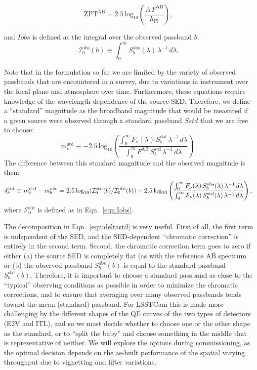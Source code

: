 \documentclass[SE,authoryear,lsstdraft,toc]{lsstdoc}
\newcommand{\mobs}{m_b^{\mathrm{obs}}}
\newcommand{\mstd}{m_b^{\mathrm{std}}}
\newcommand{\Sobs}{S_b^{\mathrm{obs}}}
\newcommand{\Sstd}{S_b^{\mathrm{std}}}
\newcommand{\Iobs}{\mathcal{I}_0^{\mathrm{obs}}}
\newcommand{\Istd}{\mathcal{I}_0^{\mathrm{std}}}
\begin{document}
\begin{equation}
\mathrm{ZPT}^{\mathrm{AB}} = 2.5\,\mathrm{log}_{10}
 \left (\frac{A\,F^{\mathrm{AB}}}{h_{\mathrm{Pl}}} \right ),
\end{equation}

and $Iobs$ is defined as the integral over the observed passband $b$:
%
\begin{equation}
\label{eqn:Iobs}
\Iobs(b) \equiv \int_0^\infty \Sobs(\lambda)\,\lambda^{-1}\,d\lambda.
\end{equation}
%

Note that in the formulation so far we are limited by the variety of observed
passbands that are encountered in a survey, due to variations in instrument
over the focal plane and atmosphere over time.  Furthermore, these equations
require knowledge of the wavelength dependence of the source SED.  Therefore,
we define a ``standard'' magnitude as the broadband magnitude that would be
measured if a given source were observed through a standard passband $Sstd$
that we are free to choose:
%
\begin{equation}
\mstd \equiv -2.5\,\mathrm{log}_{10} \left ( \frac{\int_0^\infty
  F_\nu(\lambda)\,\Sstd\,\lambda^{-1}\,d\lambda}{\int_0^\infty
  F^{\mathrm{AB}}\,\Sstd\,\lambda^{-1}\,d\lambda} \right ).
\end{equation}
%
The difference between this standard magnitude and the observed magnitude is
then:
%
\begin{equation}
\label{eqn:deltastd}
\delta_b^{\mathrm{std}} \equiv \mstd - \mobs\\
= 2.5\,\mathrm{log}_{10}(\Istd(b)/\Iobs(b))\\
+ 2.5\,\mathrm{log}_{10} \left ( \frac{\int_0^{\infty}
  F_\nu(\lambda)\,\Sobs(\lambda)\,\lambda^{-1}\,d\lambda}{\int_0^{\infty}
  F_\nu(\lambda)\,\Sstd(\lambda)\,\lambda^{-1}\,d\lambda} \right ),
\end{equation}
%
where $\Istd$ is defined as in Eqn.~\ref{eqn:Iobs}.

The decomposition in Eqn.~\ref{eqn:deltastd} is very useful.  First of all, the
first term is independent of the SED, and the SED-dependent ``chromatic
correction'' is entirely in the second term.  Second, the chromatic correction
term goes to zero if either (a) the source SED is completely flat (as with the
reference AB spectrum or (b) the observed passband $\Sobs(b)$ is equal to the
standard passband $\Sstd(b)$.  Therefore, it is important to choose a standard
passband as close to the ``typical'' observing conditions as possible in order
to minimize the chromatic corrections, and to ensure that averaging over many
observed passbands tends toward the mean (standard) passband.  For LSSTCam this
is made more challenging by the different shapes of the QE curves of the two
types of detectors (E2V and ITL), and so we must decide whether to choose one
or the other shape as the standard, or to ``split the baby'' and choose
something in the middle that is representative of neither. We will explore the
options during commissioning, as the optimal decision depends on the as-built
performance of the spatial varying throughput due to vignetting and filter
variations.
\end{document}
